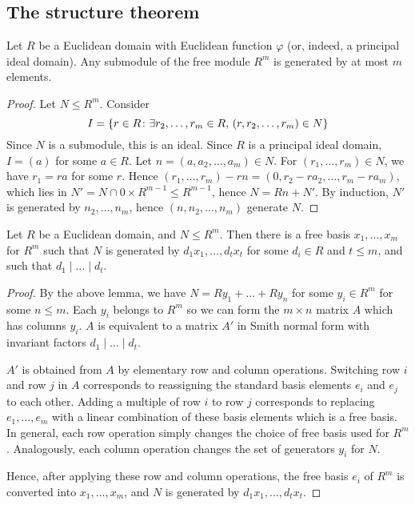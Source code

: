 \subsection{The structure theorem}
\begin{lemma}
	Let \( R \) be a Euclidean domain with Euclidean function \( \varphi \) (or, indeed, a principal ideal domain).
	Any submodule of the free module \( R^m \) is generated by at most \( m \) elements.
\end{lemma}
\begin{proof}
	Let \( N \leq R^m \).
	Consider
	\[
		I = \qty{r \in R \colon \exists r_2, \dots, r_m \in R,\, (r,r_2, \dots, r_m) \in N}
	\]
	Since \( N \) is a submodule, this is an ideal.
	Since \( R \) is a principal ideal domain, \( I = (a) \) for some \( a \in R \).
	Let \( n = (a, a_2, \dots, a_m) \in N \).
	For \( (r_1, \dots, r_m) \in N \), we have \( r_1 = ra \) for some \( r \).
	Hence \( (r_1, \dots, r_m) - rn = (0,r_2 - ra_2, \dots, r_m - ra_m) \), which lies in \( N' = N \cap \qty{0} \times R^{m-1} \leq R^{m-1} \), hence \( N = Rn + N' \).
	By induction, \( N' \) is generated by \( n_2, \dots, n_m \), hence \( (n, n_2, \dots, n_m) \) generate \( N \).
\end{proof}
\begin{theorem}
	Let \( R \) be a Euclidean domain, and \( N \leq R^m \).
	Then there is a free basis \( x_1, \dots, x_m \) for \( R^m \) such that \( N \) is generated by \( d_1 x_1, \dots, d_t x_t \) for some \( d_i \in R \) and \( t \leq m \), and such that \( d_1 \mid \dots \mid d_t \).
\end{theorem}
\begin{proof}
	By the above lemma, we have \( N = R y_1 + \dots + R y_n \) for some \( y_i \in R^m \) for some \( n \leq m \).
	Each \( y_i \) belongs to \( R^m \) so we can form the \( m \times n \) matrix \( A \) which has columns \( y_i \).
	\( A \) is equivalent to a matrix \( A' \) in Smith normal form with invariant factors \( d_1 \mid \dots \mid d_t \).

	\( A' \) is obtained from \( A \) by elementary row and column operations.
	Switching row \( i \) and row \( j \) in \( A \) corresponds to reassigning the standard basis elements \( e_i \) and \( e_j \) to each other.
	Adding a multiple of row \( i \) to row \( j \) corresponds to replacing \( e_1, \dots, e_m \) with a linear combination of these basis elements which is a free basis.
	In general, each row operation simply changes the choice of free basis used for \( R^m \).
	Analogously, each column operation changes the set of generators \( y_i \) for \( N \).

	Hence, after applying these row and column operations, the free basis \( e_i \) of \( R^m \) is converted into \( x_1, \dots, x_m \), and \( N \) is generated by \( d_1 x_1, \dots, d_t x_t \).
\end{proof}
